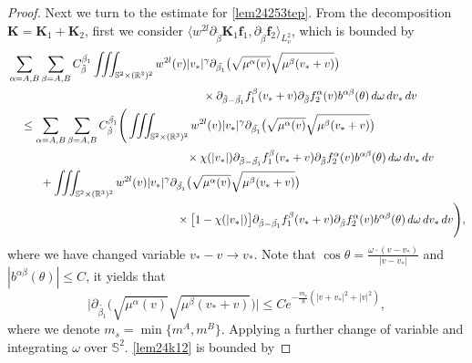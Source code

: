 \documentclass[reqno]{amsart}
\numberwithin{equation}{section}
\numberwithin{equation}{section}
\begin{document}
\begin{proof}
		Next we turn to the estimate for \eqref{lem24253tep}. From the decomposition $\mathbf{K}=\mathbf{K}_1+\mathbf{K}_2$, first we consider $\big\langle w^{2l} \partial_{\tilde{\beta}}\mathbf{K}_1 \mathbf{f}_1, \partial_{\tilde{\beta}}\mathbf{f}_2 \big\rangle_{L^{2}_{v}}$, which is bounded by
			\begin{align}
				 & \sum_{\alpha=A,B}\sum_{\beta=A,B} C_{\tilde{\beta}}^{\tilde{\beta_1}} \iiint_{\mathbb{S}^2\times(\mathbb{R}^3)^2} w^{2l}(v)|v_*|^\gamma  \partial_{\tilde{\beta_1}}\big(\sqrt{\mu^\alpha(v)} \sqrt{\mu^\beta(v_*+v)}\big)\notag\\
				 &\hspace{6cm}\times\partial_{\tilde{\beta}-\tilde{\beta_1}}f^\beta_1(v_*+v)\partial_{\tilde{\beta}}f^\alpha_2(v)b^{\alpha \beta}(\theta)\,d\omega \, dv_*\,dv \notag\\
				&\hspace{0.4cm}\leq\sum_{\alpha=A,B}\sum_{\beta=A,B} C_{\tilde{\beta}}^{\tilde{\beta_1}} \Bigg(\iiint_{\mathbb{S}^2\times(\mathbb{R}^3)^2} w^{2l}(v)|v_*|^\gamma  \partial_{\tilde{\beta_1}}\big(\sqrt{\mu^\alpha(v)} \sqrt{\mu^\beta(v_*+v)}\big)\label{lem24k11}\\
				&\hspace{5.5cm}\times\chi(|v_{*}|)\partial_{\tilde{\beta}-\tilde{\beta_1}}f^\beta_1(v_*+v)\partial_{\tilde{\beta}}f^\alpha_2(v)b^{\alpha \beta}(\theta)\,d\omega \, dv_*\,dv \notag\\
				&\hspace{1cm}+ \iiint_{\mathbb{S}^2\times(\mathbb{R}^3)^2} w^{2l}(v)|v_*|^\gamma  \partial_{\tilde{\beta_1}}\big(\sqrt{\mu^\alpha(v)} \sqrt{\mu^\beta(v_*+v)}\big)\label{lem24k12}\\
				&\hspace{5.2cm}\times\big[1-\chi(|v_{*}|)\big]\partial_{\tilde{\beta}-\tilde{\beta_1}}f^\beta_1(v_*+v)\partial_{\tilde{\beta}}f^\alpha_2(v)b^{\alpha \beta}(\theta)\,d\omega \, dv_*\,dv \Bigg)\notag,
			\end{align}
		where we have changed variable $v_*-v\rightarrow v_*$. Note that $\cos\theta=\frac{\omega\cdot(v-v_*)}{|v-v_*|}$ and $|b^{\alpha \beta}(\theta)|\leq C$, it yields that
		\begin{equation*}
			\Big|\partial_{\tilde{\beta_1}}\big(\sqrt{\mu^\alpha(v)} \sqrt{\mu^\beta(v_*+v)}\big)\Big|\leq C e^{-\frac{m_s}{8}(|v+v_*|^2+|v|^2)},
		\end{equation*}
		where we denote $m_s=\min\{m^A,m^B\}$.
		Applying a further change of variable and integrating $\omega$ over $\mathbb{S}^2$. \eqref{lem24k12} is bounded by

\end{proof}
\end{document}
